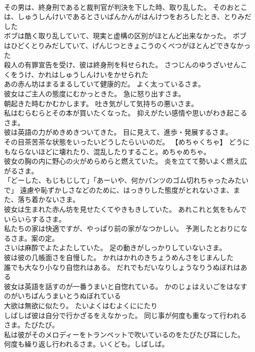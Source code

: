 \documentclass[8pt]{extreport}
\begin{document}
\begin{CJK}{UTF8}{min}
\\	その男は、終身刑であると裁判官が判決を下した時、取り乱した。	そのおとこは、しゅうしんけいであるとさいばんかんがはんけつをおろしたとき、とりみだした 
\\	ボブは酷く取り乱していて、現実と虚構の区別がほとんど出来なかった。	ボブはひどくとりみだしていて、げんじつときょこうのくべつがほとんどできなかった 
\\	殺人の有罪宣告を受け、彼は終身刑を科せられた。	さつじんのゆうざいせんこくをうけ、かれはしゅうしんけいをかせられた 
\\	あの赤ん坊はまるまるしていて健康的だ。	よく太っているさま。
\\	彼女はご主人の態度にむかっときた。	急に怒り出すさま。
\\	朝起きた時むかむかします。	吐き気がして気持ちの悪いさま。
\\	私はむらむらとその本が買いたくなった。	抑えがたい感情や思いがわき起こるさま。
\\	彼は英語の力がめきめきついてきた。	目に見えて、進歩・発展するさま。
\\	その目茶苦茶な状態をいったいどうしたらいいのだ。	【めちゃくちゃ】 どうにもならないほどに壊れたり、混乱したりすること。めちゃめちゃ。
\\	彼女の胸の内に野心の火がめらめらと燃えていた。	炎を立てて勢いよく燃え広がるさま。
\\	「どーした、もじもじして」「あーいや、何かパンツのゴム切れちゃったみたいで」	遠慮や恥ずかしさなどのために、はっきりした態度がとれないさま、また、落ち着かないさま。
\\	彼女は生まれた赤ん坊を見せたくてやきもきしていた。	あれこれと気をもんでいらいらするさま。
\\	私たちの家は快適ですが、やっぱり前の家がなつかしい。	予測したとおりになるさま。案の定。
\\	さいは麻酔でよたよたしていた。	足の動きがしっかりしていないさま。
\\	彼は彼の几帳面さを自慢した。	かれはかれのきちょうめんさをじまんした 
\\	誰でも大なり小なり自惚れはある。	だれでもだいなりしょうなりうぬぼれはある 
\\	彼女は英語を話すのが一番うまいと自惚れている。	かのじょはえいごをはなすのがいちばんうまいとうぬぼれている 
\\	大欲は無欲に似たり。	たいよくはむよくににたり 
\\	しばしば彼は自分で行かざるをえなかった。	同じ事が何度も重なって行われるさま。たびたび。
\\	私は彼がそのメロディーをトランペットで吹いているのをたびたび耳にした。	何度も繰り返し行われるさま。いくども。しばしば。

\end{CJK}
\end{document}
